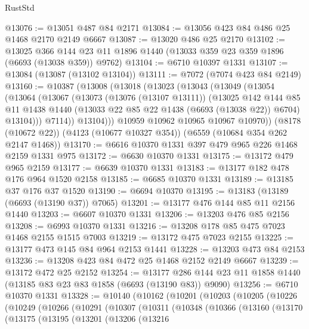 \begin{lexlean}{RustStd}
\begin{coremodule}
@13076 := @13051 @487 @84 @2171
@13084 := @13056 @423 @84 @486 @25 @1468 @2170 @2149 @6667
@13087 := @13020 @486 @25 @2170
@13102 := @13025
    @366
    @144
    @23
    @11
    @1896
    @1440
    (@13033 @359 @23 @359 @1896 (@6693 (@13038 @359)) @9762)
@13104 := @6710 @10397 @1331
@13107 := @13084 (@13087 (@13102 @13104))
@13111 := @7072 (@7074 @423 @84 @2149)
@13160 := @10387
    (@13008
      (@13018
        (@13023
          (@13043
            (@13049
              (@13054
                (@13064
                  (@13067
                    (@13073
                      (@13076 (@13107 @13111))
                      (@13025
                        @142
                        @144
                        @85
                        @11
                        @1438
                        @1440
                        (@13033 @22 @85 @22 @1438 (@6693 (@13038 @22)) @6704)
                        @13104)))
                  @7114))
              @13104)))
        @10959
        @10962
        @10965
        @10967
        @10970))
    (@8178 (@10672 @22))
    (@4123 (@10677 @10327 @354))
    (@6559 (@10684 @354 @262 @2147 @1468))
@13170 := @6616 @10370 @1331 @397 @479 @965 @226 @1468 @2159 @1331 @975
@13172 := @6630 @10370 @1331
@13175 := @13172 @479 @965 @2159
@13177 := @6639 @10370 @1331
@13183 := @13177 @182 @478 @176 @964 @1520 @2158
@13185 := @6685 @10370 @1331
@13189 := @13185 @37 @176 @37 @1520
@13190 := @6694 @10370
@13195 := @13183 (@13189 (@6693 (@13190 @37)) @7065)
@13201 := @13177 @476 @144 @85 @11 @2156 @1440
@13203 := @6607 @10370 @1331
@13206 := @13203 @476 @85 @2156
@13208 := @6993 @10370 @1331
@13216 := @13208 @178 @85 @475 @7023 @1468 @2155 @1515 @7003
@13219 := @13172 @475 @7023 @2155
@13225 := @13177 @473 @145 @84 @964 @2153 @1441
@13228 := @13203 @473 @84 @2153
@13236 := @13208 @423 @84 @472 @25 @1468 @2152 @2149 @6667
@13239 := @13172 @472 @25 @2152
@13254 := @13177 @286 @144 @23 @11 @1858 @1440 (@13185 @83 @23 @83 @1858 (@6693 (@13190 @83)) @9090)
@13256 := @6710 @10370 @1331
@13328 := @10140
    (@10162
      (@10201
        (@10203
          (@10205
            (@10226
              (@10249
                (@10266
                  (@10291
                    (@10307
                      (@10311
                        (@10348
                          (@10366
                            (@13160
                              (@13170
                                (@13175
                                  (@13195
                                    (@13201
                                      (@13206
                                        (@13216

\end{coremodule}
\end{lexlean}
